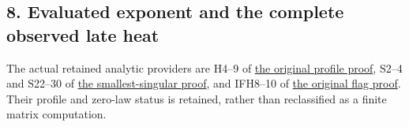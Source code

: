 \documentclass[11pt]{article}
\begin{document}
\subsection{8. Evaluated exponent and the complete observed late heat}\label{evaluated-exponent-and-the-complete-observed-late-heat}

The actual retained analytic providers are H4--9 of \href{https://github.com/KokunoYumeto/zeta-function-research-reader/blob/0fd693c844aad9117e30ec447c59864a28af10f3/workbenches/splitzero-tandem/continuations/20260921-native-spectral-real-pair/003/RETAINED_PROFILE_PROOF.tex}{the original profile proof}, S2--4 and S22--30 of \href{https://github.com/KokunoYumeto/zeta-function-research-reader/blob/0fd693c844aad9117e30ec447c59864a28af10f3/workbenches/splitzero-tandem/continuations/20260921-native-spectral-real-pair/003/NATIVE_SMALLEST_SINGULAR_PROOF.tex}{the smallest-singular proof}, and IFH8--10 of \href{https://github.com/KokunoYumeto/zeta-function-research-reader/blob/edd4008690952fb8568a01744e49ad7e180401e9/workbenches/splitzero-tandem/continuations/20260921-original-observation/INVERSE_FLAG_AND_RELATIVE_HEAT.tex\#L132}{the original flag proof}. Their profile and zero-law status is retained, rather than reclassified as a finite matrix computation.
\end{document}
